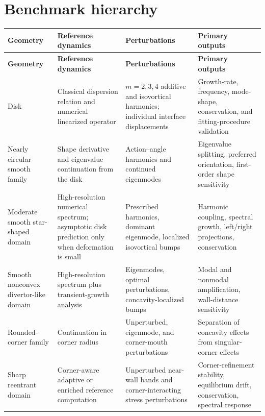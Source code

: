 \documentclass[11pt,a4paper]{article}
\begin{document}
\section{Benchmark hierarchy}

\begin{longtable}{
  >{\raggedright\arraybackslash}p{}
  >{\raggedright\arraybackslash}p{}
  >{\raggedright\arraybackslash}p{}
  >{\raggedright\arraybackslash}p{}}
\toprule
\textbf{Geometry}
&
\textbf{Reference dynamics}
&
\textbf{Perturbations}
&
\textbf{Primary outputs}
\\
\midrule
\endfirsthead

\toprule
\textbf{Geometry}
&
\textbf{Reference dynamics}
&
\textbf{Perturbations}
&
\textbf{Primary outputs}
\\
\midrule
\endhead

Disk
&
Classical dispersion relation and numerical linearized operator
&
$m=2,3,4$ additive and isovortical harmonics; individual interface displacements
&
Growth-rate, frequency, mode-shape, conservation, and fitting-procedure validation
\\[0.5em]

Nearly circular smooth family
&
Shape derivative and eigenvalue continuation from the disk
&
Action--angle harmonics and continued eigenmodes
&
Eigenvalue splitting, preferred orientation, first-order shape sensitivity
\\[0.5em]

Moderate smooth star-shaped domain
&
High-resolution numerical spectrum; asymptotic disk prediction only when deformation is small
&
Prescribed harmonics, dominant eigenmode, localized isovortical bumps
&
Harmonic coupling, spectral growth, left/right projections, conservation
\\[0.5em]

Smooth nonconvex divertor-like domain
&
High-resolution spectrum plus transient-growth analysis
&
Eigenmodes, optimal perturbations, concavity-localized bumps
&
Modal and nonmodal amplification, wall-distance sensitivity
\\[0.5em]

Rounded-corner family
&
Continuation in corner radius
&
Unperturbed, eigenmode, and corner-mouth perturbations
&
Separation of concavity effects from singular-corner effects
\\[0.5em]

Sharp reentrant domain
&
Corner-aware adaptive or enriched reference computation
&
Unperturbed near-wall bands and corner-interacting stress perturbations
&
Corner-refinement stability, equilibrium drift, conservation, spectral response
\\
\bottomrule
\end{longtable}
\end{document}
